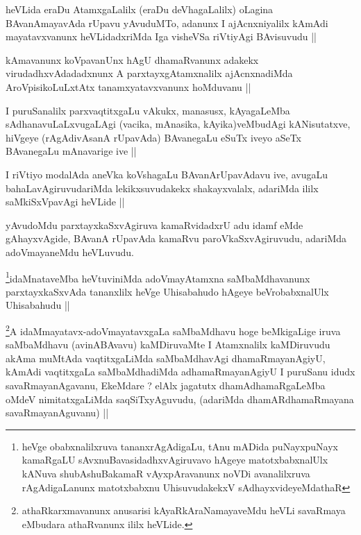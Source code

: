 \begin{artha}
heVLida eraDu AtamxgaLalilx (eraDu deVhagaLalilx) oLagina
BAvanAmayavAda rUpavu yAvuduMTo, adanunx I ajAcnxniyalilx kAmAdi
mayatavxvanunx heVLidadxriMda Iga visheVSa riVtiyAgi BAvisuvudu ||
\end{artha}


\begin{artha}
kAmavanunx koVpavanUnx hAgU dhamaRvanunx adakekx virudadhxvAdadadxnunx
A parxtayxgAtamxnalilx ajAcnxnadiMda AroVpisikoLuLxtAtx
tanamxyatavxvanunx hoMduvanu ||
\end{artha}


\begin{artha}
I puruSanalilx parxvaqtitxgaLu vAkukx, manasusx, kAyagaLeMba
sAdhanavuLaLxvugaLAgi (vacika, mAnasika, kAyika)veMbudAgi
kANisutatxve, hiVgeye (rAgAdivAsanA rUpavAda) BAvanegaLu eSuTx iveyo
aSeTx BAvanegaLu mAnavarige ive ||
\end{artha}

\begin{artha}
I riVtiyo modalAda aneVka koVshagaLu BAvanArUpavAdavu ive, avugaLu
bahaLavAgiruvudariMda lekikxsuvudakekx shakayxvalalx, adariMda ililx
saMkiSxVpavAgi heVLide ||
\end{artha}


\begin{artha}
yAvudoMdu parxtayxkaSxvAgiruva kamaRvidadxrU adu idamf eMde
gAhayxvAgide, BAvanA rUpavAda kamaRvu paroVkaSxvAgiruvudu, adariMda
adoVmayaneMdu heVLuvudu.
\end{artha}

\begin{artha}
\footnote{heVge obabxnalilxruva tananxrAgAdigaLu, tAnu mADida
  puNayxpuNayx kamaRgaLU sAvxnuBavasidadhxvAgiruvavo hAgeye
  matotxbabxnalUlx kANuva shubAshuBakamaR vAyxpAravanunx noVDi
  avanalilxruva rAgAdigaLanunx matotxbabxnu UhisuvudakekxV sAdhayxvideyeMdathaR}idaMnataveMba heVtuviniMda adoVmayAtamxna saMbaMdhavanunx
parxtayxkaSxvAda tananxlilx heVge Uhisabahudo hAgeye beVrobabxnalUlx Uhisabahudu ||
\end{artha}


\begin{artha}
\footnote{athaRkarxmavanunx anusarisi kAyaRkAraNamayaveMdu heVLi
  savaRmaya eMbudara athaRvanunx ililx heVLide.}A idaMmayatavx-adoVmayatavxgaLa saMbaMdhavu hoge
beMkigaLige iruva saMbaMdhavu (avinABAvavu) kaMDiruvaMte I Atamxnalilx
kaMDiruvudu akAma muMtAda vaqtitxgaLiMda  saMbaMdhavAgi
dhamaRmayanAgiyU, kAmAdi vaqtitxgaLa saMbaMdhadiMda adhamaRmayanAgiyU
I puruSanu idudx savaRmayanAgavanu, EkeMdare ? elAlx jagatutx
dhamAdhamaRgaLeMba oMdeV nimitatxgaLiMda saqSiTxyAguvudu, (adariMda
dhamARdhamaRmayana savaRmayanAguvanu) ||
\end{artha}

